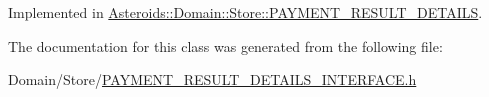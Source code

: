 Implemented in \hyperlink{classAsteroids_1_1Domain_1_1Store_1_1PAYMENT__RESULT__DETAILS_a9fd78a2e32a59b9b0a372c9422aa61cb}{Asteroids\+::\+Domain\+::\+Store\+::\+P\+A\+Y\+M\+E\+N\+T\+\_\+\+R\+E\+S\+U\+L\+T\+\_\+\+D\+E\+T\+A\+I\+LS}.



The documentation for this class was generated from the following file\+:\begin{DoxyCompactItemize}
\item 
Domain/\+Store/\hyperlink{PAYMENT__RESULT__DETAILS__INTERFACE_8h}{P\+A\+Y\+M\+E\+N\+T\+\_\+\+R\+E\+S\+U\+L\+T\+\_\+\+D\+E\+T\+A\+I\+L\+S\+\_\+\+I\+N\+T\+E\+R\+F\+A\+C\+E.\+h}\end{DoxyCompactItemize}
